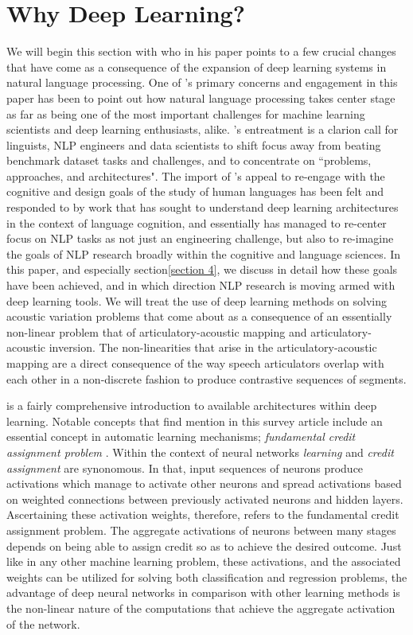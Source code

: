 \documentclass{article}[12pt]
\newcommand{\possessivecite}[1]{\citeauthor{#1}'s \citeyear{#1}}
\begin{document}
\section{Why Deep Learning?}
We will begin this section with \cite{manning2015} who in his paper points to a few crucial changes that have come as a consequence of the expansion of deep learning systems in natural language processing. One of \possessivecite{manning2015} primary concerns and engagement in this paper has been to point out how natural language processing takes center stage as far as being one of the most important challenges for machine learning scientists and deep learning enthusiasts, alike. \possessivecite{manning2015} entreatment is a clarion call for linguists, NLP engineers and data scientists to shift focus away from beating benchmark dataset tasks and challenges, and to concentrate on ``problems, approaches, and architectures". The import of \possessivecite{manning2015} appeal to re-engage with the cognitive and design goals of the study of human languages has been felt and responded to by work that has sought to understand deep learning architectures in the context of language cognition, and essentially has managed to re-center focus on NLP tasks as not just an engineering challenge, but also to re-imagine the goals of NLP research broadly within the cognitive and language sciences. In this paper, and especially section\ref{section 4}, we discuss in detail how these goals have been achieved, and in which direction NLP research is moving armed with deep learning tools. We will treat the use of deep learning methods on solving acoustic variation problems that come about as a consequence of an essentially non-linear problem that of articulatory-acoustic mapping and articulatory-acoustic inversion. The non-linearities that arise in the articulatory-acoustic mapping are a direct consequence of the way speech articulators overlap with each other in a non-discrete fashion to produce contrastive sequences of segments.

\cite{Schmidhuber2015} is a fairly comprehensive introduction to available architectures within deep learning. Notable concepts that find mention in this survey article include an essential concept in automatic learning mechanisms; \emph{fundamental credit assignment problem} \citep{minsky1963}. Within the context of neural networks \emph{learning} and \emph{credit assignment} are synonomous. In that, input sequences of neurons produce activations which manage to activate other neurons and spread activations based on weighted connections between previously activated neurons and hidden layers. Ascertaining these activation weights, therefore, refers to the fundamental credit assignment problem. The aggregate activations of neurons between many stages depends on being able to assign credit so as to achieve the desired outcome. Just like in any other machine learning problem, these activations, and the associated weights can be utilized for solving both classification and regression problems, the advantage of deep neural networks in comparison with other learning methods is the non-linear nature of the computations that achieve the aggregate activation of the network.
\end{document}
